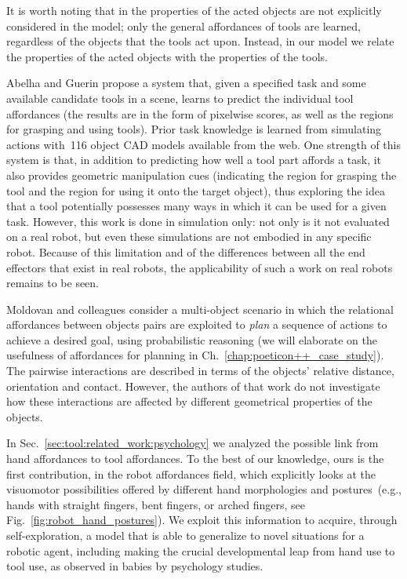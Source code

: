 It is worth noting that in
\cite{stoytchev:2005:icra,sinapov:2007:icdl,stoytchev:2008:lnai,tikhanoff:2013:humanoids,mar:2018:tcds,jain:2013:alr}
the properties
of the acted objects are not explicitly considered in the model;
only the general affordances of tools are learned, regardless
of the objects that the tools act upon.
Instead, in our model we relate the properties of the acted objects with the properties of the tools.

Abelha and Guerin \cite{abelha:2017:iros} propose a system that, given a specified task and some available candidate tools in a scene, learns to predict the individual tool affordances (the results are in the form of pixelwise scores, as well as the regions for grasping and using tools).
Prior task knowledge is learned from simulating actions with~116 object CAD models available from the web.
One strength of this system is that, in addition to predicting how well a tool part affords a task, it also provides geometric manipulation cues (indicating the region for grasping the tool and the region for using it onto the target object), thus exploring the idea that a tool potentially possesses many ways in which it can be used for a given task.
However, this work is done in simulation only: not only is it not evaluated on a real robot, but even these simulations are not embodied in any specific robot.
Because of this limitation and of the differences between all the end effectors that exist in real robots, the applicability of such a work on real robots remains to be seen.

Moldovan and colleagues consider a multi-object scenario \cite{moldovan:2018:ar} in which the relational affordances between objects pairs are exploited to \emph{plan} a sequence of actions to achieve a desired goal, using probabilistic reasoning (we will elaborate on the usefulness of affordances for planning in Ch.~\ref{chap:poeticon++_case_study}).
The pairwise interactions are described in terms of the objects' relative distance, orientation and contact.
However, the authors of that work do not investigate how these interactions are affected by different geometrical properties of the objects.

In Sec.~\ref{sec:tool:related_work:psychology} we analyzed the possible link from hand affordances to tool affordances.
To the best of our knowledge, ours is the first contribution, in the robot affordances field, which explicitly looks at the visuomotor possibilities offered by different hand morphologies and postures~(e.g., hands with straight fingers, bent fingers, or arched fingers, see Fig.~\ref{fig:robot_hand_postures}).
We exploit this information to acquire, through self-exploration, a model that is able to generalize to novel situations for a robotic agent, including making the crucial developmental leap from hand use to tool use, as observed in babies by psychology studies.

